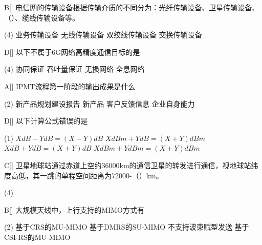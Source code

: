 \begin{choice}{B}[]
    电信网的传输设备根据传输介质的不同分为：光纤传输设备、卫星传输设备、（\quad）、缆线传输设备等。
    \begin{tasks}(4)
        \task 业务传输设备
        \task 无线传输设备
        \task 双绞线传输设备
        \task 交换传输设备
    \end{tasks}
\end{choice}

\begin{choice}{D}[]
    以下不属于6G网络高精度通信目标的是
    \begin{tasks}(4)
        \task 协同保证
        \task 吞吐量保证
        \task 无损网络
        \task 全息网络
    \end{tasks}
\end{choice}




\begin{choice}{A}[]
    IPMT流程第一阶段的输出成果是什么
    \begin{tasks}(2)
        \task 新产品规划建设报告
        \task 新产品
        \task 客户反馈信息
        \task 企业自身能力
    \end{tasks}
\end{choice}


\begin{choice}{D}[]
    以下计算公式错误的是
    \begin{tasks}(1)
        \task $XdB-YdB=(X-Y)dB$
        \task $XdBm+YdB=(X+Y)dBm$
        \task $XdB+YdB=(X+Y)dB$
        \task $XdBm+YdBm=(X+Y)dBm$
    \end{tasks}
\end{choice}


\begin{choice}{C}[]
    卫星地球站通过赤道上空约36000km的通信卫星的转发进行通信，视地球站纬度高低，其一跳的单程空间距离为72000-（\quad）km。
    \begin{tasks}(4)
    \end{tasks}
\end{choice}


\begin{choice}{B}[]
    大规模天线中，上行支持的MIMO方式有
    \begin{tasks}(2)
        \task 基于CRS的MU-MIMO
        \task 基于DMRS的SU-MIMO
        \task 不支持波束赋型发送
        \task 基于CSI-RS的MU-MIMO
    \end{tasks}
\end{choice}

